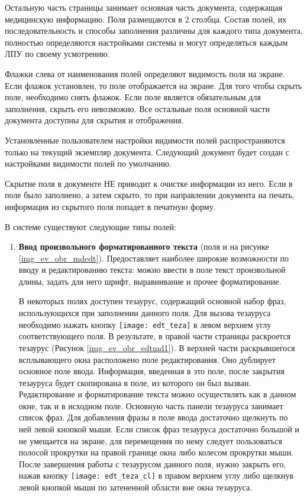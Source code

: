 {Остальную часть страницы занимает основная часть документа, содержащая медицинскую информацию. Поля размещаются в 2 столбца. Состав полей, их последовательность и способы заполнения различны для каждого типа документа, полностью определяются настройками системы и могут определяться каждым ЛПУ по своему усмотрению.  

Флажки слева от наименования полей определяют видимость поля на экране. Если флажок установлен, то поле отображается на экране. Для того чтобы скрыть поле, необходимо снять флажок. Если поле является обязательным для заполнения, скрыть его невозможно. Все остальные поля основной части документа доступны для скрытия и отображения. 

\begin{prim}
Установленные пользователем настройки видимости полей распространяются только на текущий экземпляр документа. Следующий документ будет создан с настройками видимости полей по умолчанию.
\end{prim}

\begin{vnim}
Скрытие поля в документе НЕ приводит к очистке информации из него. Если в поле было заполнено, а затем скрыто, то при направлении документа на печать, информация из скрытого поля попадет в печатную форму. 
\end{vnim}

В системе существуют следующие типы полей:
\begin{enumerate}
 \item \textbf{Ввод произвольного форматированного текста} (поля  и  на рисунке \ref{img_ev_obr_mdedt}). Предоставляет наиболее широкие возможности по вводу и редактированию текста: можно ввести в поле текст произвольной длины, задать для него шрифт, выравнивание и прочее форматирование. 
 
 В некоторых полях доступен тезаурус, содержащий основной набор фраз, использующихся при заполнении данного поля. Для вызова тезауруса необходимо нажать кнопку \texttt{[image: edt\_teza]} в левом верхнем углу соответствующего поля. В результате, в правой части страницы раскроется тезаурус (Рисунок \ref{img_ev_obr_edtmd1}). В верхней части раскрывшегося всплывающего окна расположено поле редактирования. Оно дублирует основное поле ввода. Информация, введенная в это поле, после закрытия тезауруса будет скопирована в поле, из которого он был вызван. Редактирование и форматирование текста можно осуществлять как в данном окне, так и в исходном поле. Основную часть панели тезауруса занимает список фраз. Для добавления фразы в поле ввода достаточно щелкнуть по ней левой кнопкой мыши. Если список фраз тезауруса достаточно большой и не умещается на экране, для перемещения по нему следует пользоваться полосой прокрутки на правой границе окна либо колесом прокрутки мыши. После завершения работы с тезаурусом данного поля, нужно закрыть его, нажав кнопку \texttt{[image: edt\_teza\_cl]} в правом верхнем углу либо щелкнув левой кнопкой мыши по затененной области вне окна тезауруса. 
 

\end{enumerate}}
